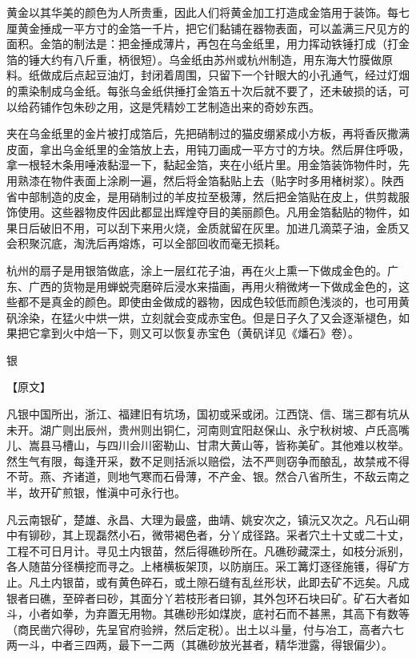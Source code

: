 \documentclass[12pt,UTF8]{ctexbook}
\begin{document}
黄金以其华美的颜色为人所贵重，因此人们将黄金加工打造成金箔用于装饰。每七厘黄金捶成一平方寸的金箔一千片，把它们黏铺在器物表面，可以盖满三尺见方的面积。金箔的制法是：把金捶成薄片，再包在乌金纸里，用力挥动铁锤打成（打金箔的锤大约有八斤重，柄很短）。乌金纸由苏州或杭州制造，用东海大竹膜做原料。纸做成后点起豆油灯，封闭着周围，只留下一个针眼大的小孔通气，经过灯烟的熏染制成乌金纸。每张乌金纸供捶打金箔五十次后就不要了，还未破损的话，可以给药铺作包朱砂之用，这是凭精妙工艺制造出来的奇妙东西。

夹在乌金纸里的金片被打成箔后，先把硝制过的猫皮绷紧成小方板，再将香灰撒满皮面，拿出乌金纸里的金箔放上去，用钝刀画成一平方寸的方块。然后屏住呼吸，拿一根轻木条用唾液黏湿一下，黏起金箔，夹在小纸片里。用金箔装饰物件时，先用熟漆在物件表面上涂刷一遍，然后将金箔黏贴上去（贴字时多用楮树浆）。陕西省中部制造的皮金，是用硝制过的羊皮拉至极薄，然后把金箔贴在皮上，供剪裁服饰使用。这些器物皮件因此都显出辉煌夺目的美丽颜色。凡用金箔黏贴的物件，如果日后破旧不用，可以刮下来用火烧，金质就留在灰里。加进几滴菜子油，金质又会积聚沉底，淘洗后再熔炼，可以全部回收而毫无损耗。

杭州的扇子是用银箔做底，涂上一层红花子油，再在火上熏一下做成金色的。广东、广西的货物是用蝉蜕壳磨碎后浸水来描画，再用火稍微烤一下做成金色的，这些都不是真金的颜色。即使由金做成的器物，因成色较低而颜色浅淡的，也可用黄矾涂染，在猛火中烘一烘，立刻就会变成赤宝色。但是日子久了又会逐渐褪色，如果把它拿到火中焙一下，则又可以恢复赤宝色（黄矾详见《燔石》卷）。

银

【原文】

凡银中国所出，浙江、福建旧有坑场，国初或采或闭。江西饶、信、瑞三郡有坑从未开。湖广则出辰州，贵州则出铜仁，河南则宜阳赵保山、永宁秋树坡、卢氏高嘴儿、嵩县马槽山，与四川会川密勒山、甘肃大黄山等，皆称美矿。其他难以枚举。然生气有限，每逢开采，数不足则括派以赔偿，法不严则窃争而酿乱，故禁戒不得不苛。燕、齐诸道，则地气寒而石骨薄，不产金、银。然合八省所生，不敌云南之半，故开矿煎银，惟滇中可永行也。

凡云南银矿，楚雄、永昌、大理为最盛，曲靖、姚安次之，镇沅又次之。凡石山硐中有铆砂，其上现磊然小石，微带褐色者，分丫成径路。采者穴土十丈或二十丈，工程不可日月计。寻见土内银苗，然后得礁砂所在。凡礁砂藏深土，如枝分派别，各人随苗分径横挖而寻之。上楮横板架顶，以防崩压。采工篝灯逐径施镬，得矿方止。凡土内银苗，或有黄色碎石，或土隙石缝有乱丝形状，此即去矿不远矣。凡成银者曰礁，至碎者曰砂，其面分丫若枝形者曰铆，其外包环石块曰矿。矿石大者如斗，小者如拳，为弃置无用物。其礁砂形如煤炭，底衬石而不甚黑，其高下有数等（商民凿穴得砂，先呈官府验辨，然后定税）。出土以斗量，付与冶工，高者六七两一斗，中者三四两，最下一二两（其礁砂放光甚者，精华泄露，得银偏少）。
\end{document}
